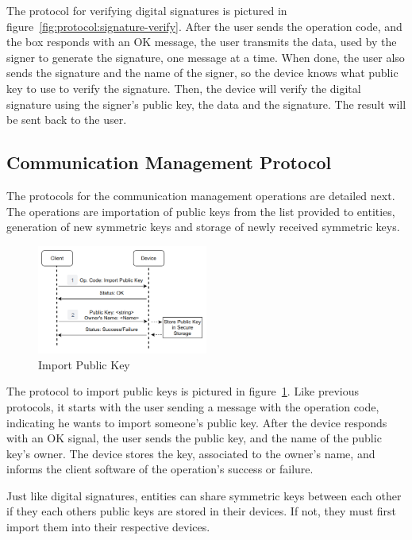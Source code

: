 The protocol for verifying digital signatures is pictured in figure~\ref{fig:protocol:signature-verify}.
After the user sends the operation code, and the box responds with an OK message, the user transmits the data, used by the signer to generate the signature, one message at a time.
When done, the user also sends the signature and the name of the signer, so the device knows what public key to use to verify the signature.
Then, the device will verify the digital signature using the signer's public key, the data and the signature. The result will be sent back to the user.

\subsection{Communication Management Protocol}\label{chap:solution:protocol:key}

The protocols for the communication management operations are detailed next. The operations are importation of public keys from the list provided to entities, generation of new symmetric keys and storage of newly received symmetric keys.

\begin{figure}[h]
	\centering
	\includegraphics[width=0.5\textwidth]{./Images/import-pub-key.png}
	\caption{Import Public Key}\label{fig:protocol:import-pub}
\end{figure}

The protocol to import public keys is pictured in figure~\ref{fig:protocol:import-pub}.
Like previous protocols, it starts with the user sending a message with the operation code, indicating he wants to import someone's public key.
After the device responds with an OK signal, the user sends the public key, and the name of the public key's owner.
The device stores the key, associated to the owner's name, and informs the client software of the operation's success or failure.

\hfill
\hfill

Just like digital signatures, entities can share symmetric keys between each other if they each others public keys are stored in their devices. If not, they must first import them into their respective devices.

